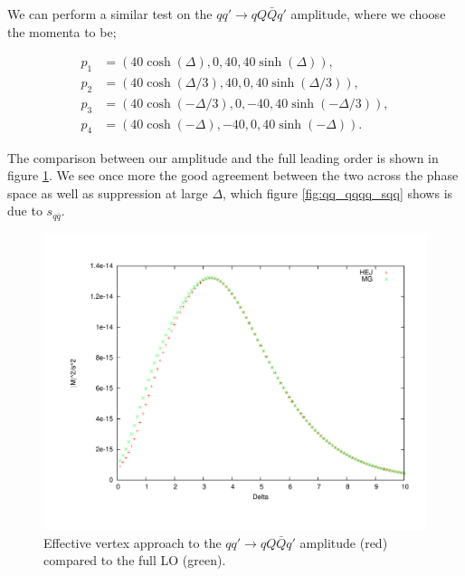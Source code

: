 We can perform a similar test on the $qq' \to qQ\bar{Q}q'$ amplitude, where we choose the momenta to be;

\begin{equation}
\begin{split}
p_1 & = (40 \cosh(\Delta), 0, 40, 40 \sinh(\Delta)), \\
p_2 & = (40 \cosh(\Delta/3), 40, 0, 40 \sinh(\Delta/3)), \\
p_3 & = (40 \cosh(-\Delta/3), 0, -40, 40 \sinh(-\Delta/3)), \\
p_4 & = (40 \cosh(-\Delta), -40, 0, 40 \sinh(-\Delta)). 
\end{split}
\label{eqn:4jetmom}
\end{equation}

The comparison between our amplitude and the full leading order is shown in figure \ref{fig:qq_qqqq}. We see once more the good agreement between the two across the phase space as well as suppression at large $\Delta$, which figure \ref{fig:qq_qqqq_sqq} shows is due to $s_{q \bar{q}}$. 

\begin{figure}[H]
\centering
\includegraphics[scale=0.45]{Images/qQ_qqqxQ.pdf}
\caption{Effective vertex approach to the $qq' \to qQ\bar{Q}q'$ amplitude (red) compared to the full LO (green).}
\label{fig:qq_qqqq}
\end{figure}

